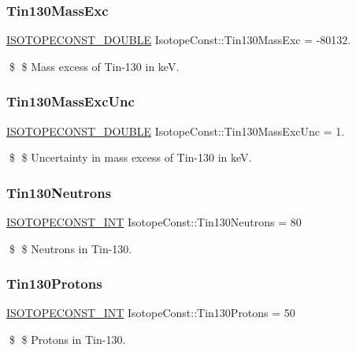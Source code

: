 \subsubsection{\texorpdfstring{Tin130\+Mass\+Exc}{Tin130MassExc}}
{\footnotesize\ttfamily \mbox{\hyperlink{group___isotope_const-_macros_ga8f45a7272ce02c0b4c65c44636ed719a}{I\+S\+O\+T\+O\+P\+E\+C\+O\+N\+S\+T\+\_\+\+D\+O\+U\+B\+LE}} Isotope\+Const\+::\+Tin130\+Mass\+Exc = -\/80132.}

\$ \$ Mass excess of Tin-\/130 in keV. \mbox{\label{group___isotope_const-_tin-_sn130_ga0b9b244d73d6848ff864b52f8c159634}} 
\subsubsection{\texorpdfstring{Tin130\+Mass\+Exc\+Unc}{Tin130MassExcUnc}}
{\footnotesize\ttfamily \mbox{\hyperlink{group___isotope_const-_macros_ga8f45a7272ce02c0b4c65c44636ed719a}{I\+S\+O\+T\+O\+P\+E\+C\+O\+N\+S\+T\+\_\+\+D\+O\+U\+B\+LE}} Isotope\+Const\+::\+Tin130\+Mass\+Exc\+Unc = 1.}

\$ \$ Uncertainty in mass excess of Tin-\/130 in keV. \mbox{\label{group___isotope_const-_tin-_sn130_ga7c03b2dca6822d22df1137bea694f091}} 
\subsubsection{\texorpdfstring{Tin130\+Neutrons}{Tin130Neutrons}}
{\footnotesize\ttfamily \mbox{\hyperlink{group___isotope_const-_macros_ga5f18360b3e99483a35c32d789e62621c}{I\+S\+O\+T\+O\+P\+E\+C\+O\+N\+S\+T\+\_\+\+I\+NT}} Isotope\+Const\+::\+Tin130\+Neutrons = 80}

\$ \$ Neutrons in Tin-\/130. \mbox{\label{group___isotope_const-_tin-_sn130_ga469b7ba869e45ab700295c472f1bff51}} 
\subsubsection{\texorpdfstring{Tin130\+Protons}{Tin130Protons}}
{\footnotesize\ttfamily \mbox{\hyperlink{group___isotope_const-_macros_ga5f18360b3e99483a35c32d789e62621c}{I\+S\+O\+T\+O\+P\+E\+C\+O\+N\+S\+T\+\_\+\+I\+NT}} Isotope\+Const\+::\+Tin130\+Protons = 50}

\$ \$ Protons in Tin-\/130. 